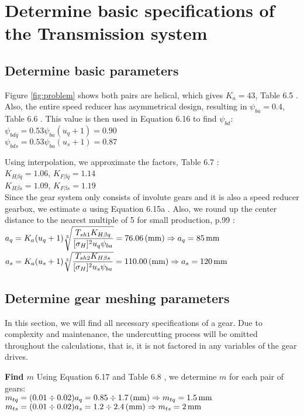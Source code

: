 \section{Determine basic specifications of the Transmission system}

\subsection{Determine basic parameters}
	Figure \ref{fig:problem} shows both pairs are helical, which  gives $ K_a = 43 $, Table 6.5 \cite{tk1}. Also, the entire speed reducer has asymmetrical design, resulting in $ \psi_{ba} = 0.4$, Table 6.6 \cite{tk1}. This value is then used in Equation 6.16 \cite{tk1} to find $ \psi_{bd} $:\\
$ \psi_{bdq} = 0.53\psi_{ba}(u_q+1) = 0.90 $\\
$ \psi_{bds} = 0.53\psi_{ba}(u_s+1) = 0.87 $

Using interpolation, we approximate the factors, Table 6.7 \cite{tk1}:\\
$ K_{H\beta q} = 1.06 $, $ K_{F\beta q} = 1.14 $\\
$ K_{H\beta s} = 1.09 $, $ K_{F\beta s} = 1.19 $\\
Since the gear system only consists of involute gears and it is also a speed reducer gearbox, we estimate $ a $ using Equation 6.15a \cite{tk1}. Also, we round up the center distance to the nearest multiple of 5 for small production, p.99 \cite{tk1}:\\
$ a_q = K_a(u_{q}+1)\sqrt[3]{\dfrac{T_{sh1}K_{H\beta q}}{[{\sigma}_H]^2u_{q}\psi_{ba}}} = 76.06 \, (\mathrm{mm}) \Rightarrow a_{q}= 85 \, \mathrm{mm}$\\
$ a_s = K_a(u_{s}+1)\sqrt[3]{\dfrac{T_{sh2}K_{H\beta s}}{[{\sigma}_H]^2u_{s}\psi_{ba}}} = 110.00 \, (\mathrm{mm}) \Rightarrow a_{s}= 120 \, \mathrm{mm}$
\subsection{Determine gear meshing parameters}
In this section, we will find all necessary specifications of a gear. Due to complexity and maintenance, the undercutting process will be omitted throughout the calculations, that is, it is not factored in any variables of the gear drives.

\textbf{Find $ m $} Using Equation 6.17 \cite{tk1} and Table 6.8 \cite{tk1}, we determine $ m $ for each pair of gears:\\
$ m_{tq} = (0.01\div0.02)a_{q} = 0.85 \div 1.7 \, (\mathrm{mm}) \Rightarrow m_{tq}=\SI{1.5}{mm}$\\
$ m_{ts} = (0.01\div0.02)a_{s} = 1.2 \div 2.4 \, (\mathrm{mm}) \Rightarrow m_{ts}=\SI{2}{mm}$

